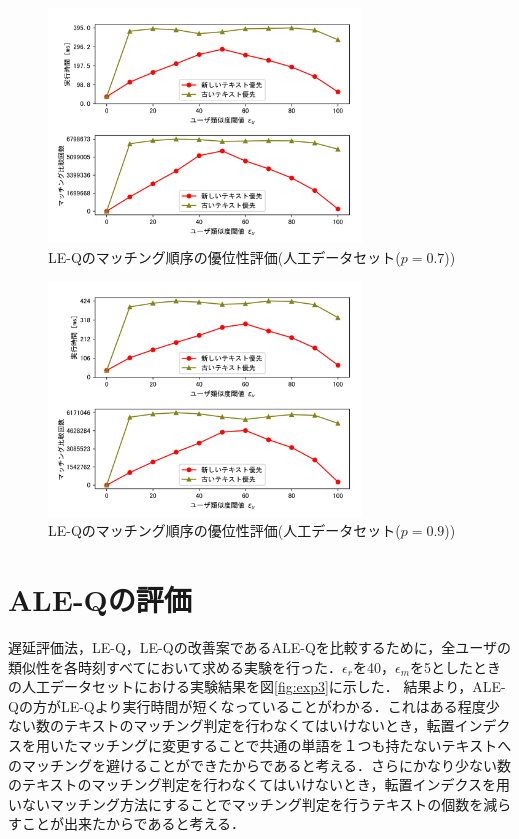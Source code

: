 \begin{figure}[H]
    \centering
    \includegraphics[width=8.3cm]{eimg/exp2_7.png}
    \caption{LE-Qのマッチング順序の優位性評価(人工データセット($p=0.7$))}
    \label{fig:exp2_7}
\end{figure}
\begin{figure}[H]
    \centering
    \includegraphics[width=8.3cm]{eimg/exp2_9.png}
    \caption{LE-Qのマッチング順序の優位性評価(人工データセット($p=0.9$))}
    \label{fig:exp2_9}
\end{figure}



\section{ALE-Qの評価}
遅延評価法，LE-Q，LE-Qの改善案であるALE-Qを比較するために，全ユーザの類似性を各時刻すべてにおいて求める実験を行った．$\epsilon_r$を40，$\epsilon_m$を5としたときの人工データセットにおける実験結果を図\ref{fig:exp3}に示した．
結果より，ALE-Qの方がLE-Qより実行時間が短くなっていることがわかる．これはある程度少ない数のテキストのマッチング判定を行わなくてはいけないとき，転置インデクスを用いたマッチングに変更することで共通の単語を１つも持たないテキストへのマッチングを避けることができたからであると考える．さらにかなり少ない数のテキストのマッチング判定を行わなくてはいけないとき，転置インデクスを用いないマッチング方法にすることでマッチング判定を行うテキストの個数を減らすことが出来たからであると考える．

